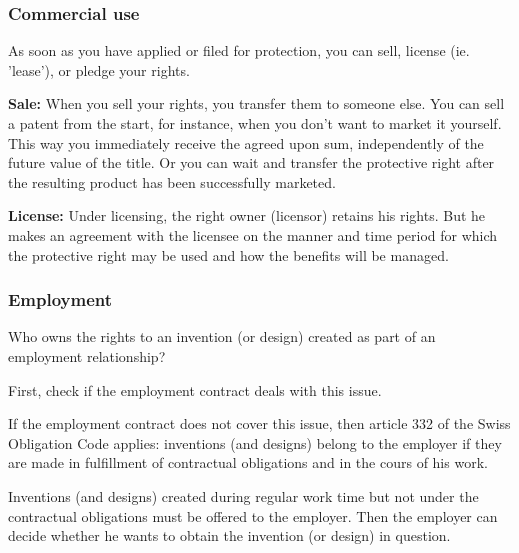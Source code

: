 \subsubsection{Commercial use}
As soon as you have applied or filed for protection, you can sell, license (ie. 'lease’), or pledge your rights.
\begin{compactitem}
	\item \textbf{Sale:} When you sell your rights, you transfer them to someone else. You can sell a patent from the start, for instance, when you don’t want to market it yourself.	This way you immediately receive the agreed upon sum, independently of the future value of the title. Or you can wait and transfer the protective right after the resulting product has been successfully marketed.
	\item \textbf{License:} Under licensing, the right owner (licensor) retains his rights. But he makes an agreement with the licensee on the manner and time period for which the protective right may be used and how the benefits will be 	managed.
\end{compactitem}

\subsubsection{Employment}
Who owns the rights to an invention (or design) created as part of an employment relationship?
\begin{compactitem}
	\item First, check if the employment contract deals with this issue.
	\item If the employment contract does not cover this issue, then article 332 of	the Swiss Obligation Code applies: inventions (and designs) belong to the	employer if they are made in fulfillment of contractual obligations and in
	the cours of his work.
	\item Inventions (and designs) created during regular work time but not under the contractual obligations must be offered to the employer. Then the employer can decide whether he wants to obtain the invention (or design) in question.
\end{compactitem}